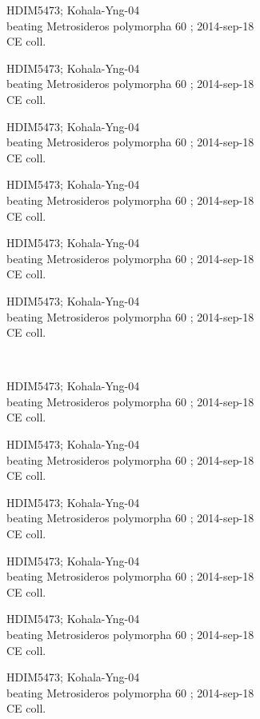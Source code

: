 \documentclass[2pt]{extarticle}
\begin{document}
\noindent
\raggedright
\parbox{0.16\textwidth}{\tiny \raggedright \rule[-0.3\baselineskip]{0pt}{10pt}HDIM5473; Kohala-Yng-04\\ beating Metrosideros polymorpha 60 ; 2014-sep-18\\ CE coll.}
\parbox{0.16\textwidth}{\tiny \raggedright \rule[-0.3\baselineskip]{0pt}{10pt}HDIM5473; Kohala-Yng-04\\ beating Metrosideros polymorpha 60 ; 2014-sep-18\\ CE coll.}
\parbox{0.16\textwidth}{\tiny \raggedright \rule[-0.3\baselineskip]{0pt}{10pt}HDIM5473; Kohala-Yng-04\\ beating Metrosideros polymorpha 60 ; 2014-sep-18\\ CE coll.}
\parbox{0.16\textwidth}{\tiny \raggedright \rule[-0.3\baselineskip]{0pt}{10pt}HDIM5473; Kohala-Yng-04\\ beating Metrosideros polymorpha 60 ; 2014-sep-18\\ CE coll.}
\parbox{0.16\textwidth}{\tiny \raggedright \rule[-0.3\baselineskip]{0pt}{10pt}HDIM5473; Kohala-Yng-04\\ beating Metrosideros polymorpha 60 ; 2014-sep-18\\ CE coll.}
\parbox{0.16\textwidth}{\tiny \raggedright \rule[-0.3\baselineskip]{0pt}{10pt}HDIM5473; Kohala-Yng-04\\ beating Metrosideros polymorpha 60 ; 2014-sep-18\\ CE coll.} \\ 
\vspace{0.001in} 

\noindent
\parbox{0.16\textwidth}{\tiny \raggedright \rule[-0.3\baselineskip]{0pt}{10pt}HDIM5473; Kohala-Yng-04\\ beating Metrosideros polymorpha 60 ; 2014-sep-18\\ CE coll.}
\parbox{0.16\textwidth}{\tiny \raggedright \rule[-0.3\baselineskip]{0pt}{10pt}HDIM5473; Kohala-Yng-04\\ beating Metrosideros polymorpha 60 ; 2014-sep-18\\ CE coll.}
\parbox{0.16\textwidth}{\tiny \raggedright \rule[-0.3\baselineskip]{0pt}{10pt}HDIM5473; Kohala-Yng-04\\ beating Metrosideros polymorpha 60 ; 2014-sep-18\\ CE coll.}
\parbox{0.16\textwidth}{\tiny \raggedright \rule[-0.3\baselineskip]{0pt}{10pt}HDIM5473; Kohala-Yng-04\\ beating Metrosideros polymorpha 60 ; 2014-sep-18\\ CE coll.}
\parbox{0.16\textwidth}{\tiny \raggedright \rule[-0.3\baselineskip]{0pt}{10pt}HDIM5473; Kohala-Yng-04\\ beating Metrosideros polymorpha 60 ; 2014-sep-18\\ CE coll.}
\parbox{0.16\textwidth}{\tiny \raggedright \rule[-0.3\baselineskip]{0pt}{10pt}HDIM5473; Kohala-Yng-04\\ beating Metrosideros polymorpha 60 ; 2014-sep-18\\ CE coll.} \\ 
\vspace{0.001in} 
\end{document}
